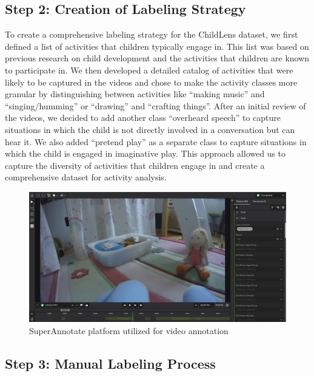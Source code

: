 \documentclass[
  man,floatsintext]{apa6}
\begin{document}
\subsection{Step 2: Creation of Labeling Strategy}\label{step-2-creation-of-labeling-strategy}

To create a comprehensive labeling strategy for the ChildLens dataset, we first defined a list of activities that children typically engage in. This list was based on previous research on child development and the activities that children are known to participate in. We then developed a detailed catalog of activities that were likely to be captured in the videos and chose to make the activity classes more granular by distinguishing between activities like ``making music'' and ``singing/humming'' or ``drawing'' and ``crafting things''. After an initial review of the videos, we decided to add another class ``overheard speech'' to capture situations in which the child is not directly involved in a conversation but can hear it. We also added ``pretend play'' as a separate class to capture situations in which the child is engaged in imaginative play. This approach allowed us to capture the diversity of activities that children engage in and create a comprehensive dataset for activity analysis.

\begin{figure}

{\centering \includegraphics[width=5.76in]{SuperAnnotate} 

}

\caption{SuperAnnotate platform utilized for video annotation}\label{fig:superannotate}
\end{figure}

\subsection{Step 3: Manual Labeling Process}\label{step-3-manual-labeling-process}
\end{document}
